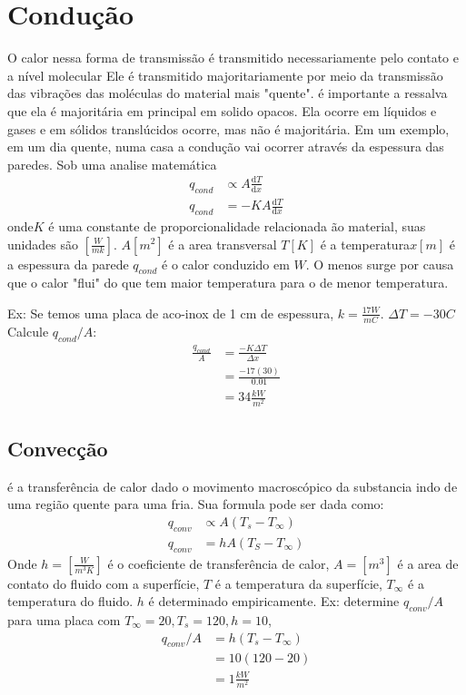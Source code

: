 \section{Condução}
O calor nessa forma de transmissão é transmitido necessariamente pelo contato e a nível molecular Ele
é transmitido majoritariamente por meio da transmissão das vibrações das moléculas do material mais
"quente". é importante a ressalva que ela é majoritária em principal em solido opacos. Ela ocorre em
líquidos e gases e em sólidos translúcidos ocorre, mas não é majoritária. Em um exemplo, em um dia
quente, numa casa a condução vai ocorrer através da espessura das paredes. Sob uma analise
matemática
\begin{align}\label{eq:equacao de conducao}
    q_{cond} &\propto A\frac{\mathrm{d}T}{\mathrm{d}x}\\
    q_{cond}&=-KA\frac{\mathrm{d}T}{\mathrm{d}x}
\end{align}
onde\(K\) é uma constante de proporcionalidade relacionada ão material, suas unidades são
\([\frac{W}{mk}]\). \(A [m^2]\) é a area transversal \(T [K]\) é a temperatura\(x [m]\) é a espessura
da parede \(q_{cond}\) é o calor conduzido em \(W\). O menos surge por causa que o calor "flui" do
que tem maior temperatura para o de menor temperatura.
 \par
 Ex: Se temos uma placa de aco-inox de 1 cm de espessura, \(k=\frac{17 W}{mC}\). \(\Delta T=-30 C\)
 Calcule \(q_{cond}/A\):
 \begin{align}
     \frac{q_{cond}}{A}&=\frac{-K \Delta T}{\Delta x}\\
     &=\frac{-17 (30)}{0.01}\\
     &=34 \frac{kW}{m^2}
 \end{align}
 \subsection{Convecção}
 é a transferência de calor dado o movimento macroscópico da substancia indo de uma região quente
 para uma fria. Sua formula pode ser dada como:
 \begin{align}
     q_{conv} &\propto A(T_s-T_{\infty})\\
     q_{conv}& =hA(T_S-T_{\infty})
 \end{align}
Onde \(h= [\frac{W}{m^3K}]\) é o coeficiente de transferência de calor, \(A= [m^3]\) é a area de
contato do fluido com a superfície, \(T\) é a temperatura da superfície, \(T_{\infty}\) é a
temperatura do fluido. \(h\) é determinado empiricamente. Ex: determine \(q_{conv}/A\) para uma
placa com \(T_{\infty}=20,T_s=120,h=10\),
\begin{align}
    q_{conv}/A&=h(T_s-T_{\infty})\\
    &=10(120-20)\\
    &=1\frac{kW}{m^2}
\end{align}
